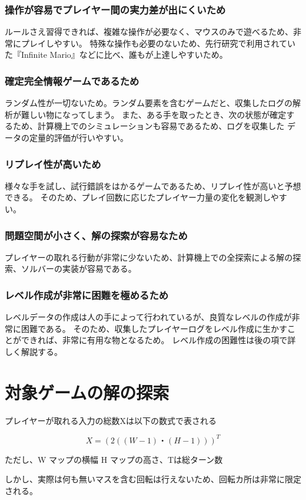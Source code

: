 \subsubsection{操作が容易でプレイヤー間の実力差が出にくいため}
ルールさえ習得できれば、複雑な操作が必要なく、マウスのみで遊べるため、非常にプレイしやすい。
特殊な操作も必要のないため、先行研究で利用されていた『Infinite Mario』などに比べ、誰もが上達しやすいため。
\subsubsection{確定完全情報ゲームであるため}
ランダム性が一切ないため。ランダム要素を含むゲームだと、収集したログの解析が難しい物になってしまう。
また、ある手を取ったとき、次の状態が確定するため、計算機上でのシミュレーションも容易であるため、ログを収集した
データの定量的評価が行いやすい。
\subsubsection{リプレイ性が高いため}
様々な手を試し、試行錯誤をはかるゲームであるため、リプレイ性が高いと予想できる。
そのため、プレイ回数に応じたプレイヤー力量の変化を観測しやすい。

\subsubsection{問題空間が小さく、解の探索が容易なため}
プレイヤーの取れる行動が非常に少ないため、計算機上での全探索による解の探索、ソルバーの実装が容易である。

\subsubsection{レベル作成が非常に困難を極めるため}
レベルデータの作成は人の手によって行われているが、良質なレベルの作成が非常に困難である。
そのため、収集したプレイヤーログをレベル作成に生かすことができれば、非常に有用な物となるため。
レベル作成の困難性は後の項で詳しく解説する。


\section{対象ゲームの解の探索}
プレイヤーが取れる入力の総数Xは以下の数式で表される

\[ X = (2((W-1)・(H-1)))^T \]

ただし、W マップの横幅 H マップの高さ、Tは総ターン数

しかし、実際は何も無いマスを含む回転は行えないため、回転カ所は非常に限定される。

